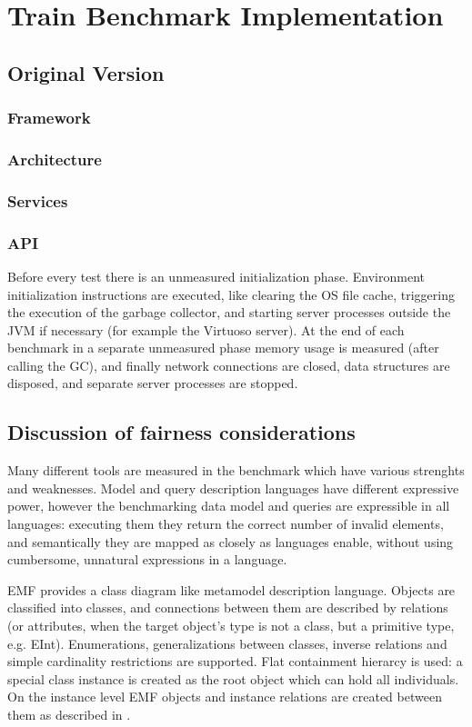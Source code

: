 \chapter{Train Benchmark Implementation}

\section{Original Version}
\subsection{Framework}
\subsection{Architecture}
\subsection{Services}
\subsection{API}

Before every test
there is an unmeasured initialization phase. Environment initialization
instructions are executed, like clearing the OS file cache, triggering the
execution of the garbage collector, and starting server processes outside the
JVM if necessary (for example the Virtuoso server). At the end of each benchmark
in a separate unmeasured phase memory usage is measured (after calling the GC),
and finally network connections are closed, data structures are disposed, and
separate server processes are stopped.


\section{Discussion of fairness considerations}
Many different tools are measured in the benchmark which have various strenghts
and weaknesses. Model and query description languages have different expressive
power, however the benchmarking data model and queries are expressible in all
languages: executing them they return the correct number of invalid elements,
and semantically they are mapped as closely as languages enable, without using
cumbersome, unnatural expressions in a language.

EMF provides a class diagram like metamodel description language. Objects are
classified into classes, and connections between them are described by relations
(or attributes, when the target object's type is not a class, but a primitive
type, e.g. EInt). Enumerations, generalizations between classes, inverse
relations and simple cardinality restrictions are supported. Flat containment
hierarcy is used: a special class instance is created as the root object which can
hold all individuals. On the instance level EMF objects and instance relations
are created between them as described in .

